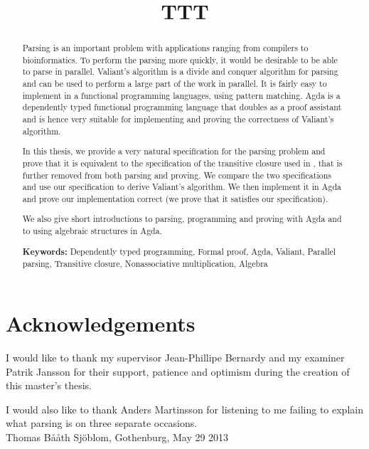\title{TTT}
\begin{abstract}%
Parsing is an important problem with applications ranging from compilers to bioinformatics. To perform the parsing more quickly, it would be desirable to be able to parse in parallel. Valiant's algorithm \citep{Valiant} is a divide and conquer algorithm for parsing and can be used to perform a large part of the work in parallel. It is fairly easy to implement in a functional programming languages, using pattern matching. Agda is a dependently typed functional programming language that doubles as a proof assistant and is hence very suitable for implementing and proving the correctness of Valiant's algorithm. 

In this thesis, we provide a very natural specification for the parsing problem and prove that it is equivalent to the specification of the transitive closure used in \citep{Valiant}, that is further removed from both parsing and proving. We compare the two specifications and use our specification to derive Valiant's algorithm. We then implement it in Agda and prove our implementation correct (we prove that it satisfies our specification).

We also give short introductions to parsing, programming and proving with Agda and to using algebraic structures in Agda.


\vfill
\flushleft
\textbf{Keywords:} Dependently typed programming, Formal proof, Agda, Valiant, Parallel parsing, Transitive closure, Nonassociative multiplication, Algebra
\end{abstract}

\newpage
\clearpage
\mbox{}
\newpage
\clearpage
\thispagestyle{empty}
\section*{Acknowledgements}
I would like to thank my supervisor Jean-Phillipe Bernardy and my examiner Patrik Jansson for their support, patience and optimism during the creation of this master's thesis.

I would also like to thank Anders Martinsson for listening to me failing to explain what parsing is on three separate occasions.\\[1cm]

\hfill Thomas B\aa\aa{}th Sj\"{o}blom, Gothenburg, May 29 2013
\newpage
\clearpage
\mbox{}
